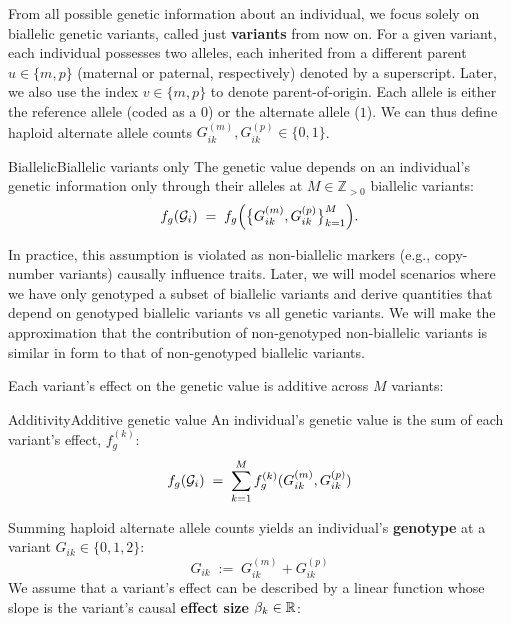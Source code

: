 \documentclass[12pt]{article}
\numberwithin{equation}{section}
\begin{document}
From all possible genetic information about an individual, we focus solely on biallelic genetic variants, called just \textbf{variants} from now on.
For a given variant, each individual possesses two alleles, each inherited from a different parent $u \in \{m,p\}$ (maternal or paternal, respectively) denoted by a superscript.
Later, we also use the index $v \in \{m,p\}$ to denote parent-of-origin.
Each allele is either the reference allele (coded as a $0$) or the alternate allele ($1$).
We can thus define haploid alternate allele counts $G_{ik}^{(m)}, G_{ik}^{(p)} \in \{0,1\}$.
\begin{assumption}{Biallelic}{Biallelic variants only}
The genetic value depends on an individual's genetic information only through their alleles at $M \in \mathbb{Z}_{>0}$ biallelic variants:
$$ f_g(\mathcal{G}_i) \;=\; f_g\Big(\big\{G_{ik}^{(m)}, G_{ik}^{(p)}\big\}_{k=1}^{M}\Big) . $$
\end{assumption}

In practice, this assumption is violated as non-biallelic markers (e.g., copy-number variants) causally influence traits.
Later, we will model scenarios where we have only genotyped a subset of biallelic variants and derive quantities that depend on genotyped biallelic variants vs all genetic variants.
We will make the approximation that the contribution of non-genotyped non-biallelic variants is similar in form to that of non-genotyped biallelic variants. 

Each variant's effect on the genetic value is additive across $M$ variants:
\begin{assumption}{Additivity}{Additive genetic value}
    An individual's genetic value is the sum of each variant's effect, $f_g^{(k)}$:
    \begin{equation}\label{eq:additivity}
        f_g(\mathcal{G}_i) \;=\; \sum_{k=1}^{M} f_g^{(k)}(G_{ik}^{(m)},G_{ik}^{(p)})
    \end{equation}
\end{assumption}

Summing haploid alternate allele counts yields an individual's \textbf{genotype} at a variant $G_{ik} \in \{0,1,2\}$:
\begin{equation}\label{eq:genotype}
    G_{ik} \;:=\; G_{ik}^{(m)} + G_{ik}^{(p)}
\end{equation}
We assume that a variant's effect can be described by a linear function whose slope is the variant's causal \textbf{effect size} $\beta_k \in \mathbb{R}$:
\end{document}
